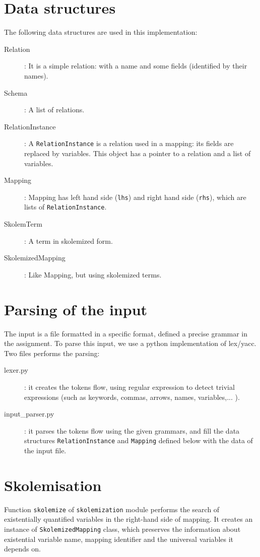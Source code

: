 \documentclass[a4paper,11pt]{article}
\begin{document}
\section{Data structures}
The following data structures are used in this implementation:
\begin{description}
  \item[Relation]: It is a simple relation: with a name and some fields (identified by their names).
  \item[Schema]: A list of relations.
  \item[RelationInstance]: A \texttt{RelationInstance} is a relation used in a mapping: its fields are replaced by variables. This object has a pointer to a relation and a list of variables.
  \item[Mapping]: Mapping has left hand side (\texttt{lhs}) and right hand side (\texttt{rhs}), which are lists of \texttt{RelationInstance}.
  \item[SkolemTerm]: A term in skolemized form.
  \item[SkolemizedMapping]: Like Mapping, but using skolemized terms.
\end{description}

\section{Parsing of the input}
The input is a file formatted in a specific format, defined a precise grammar in the assignment. To parse this input, we use a python implementation of lex/yacc. Two files performs the parsing:
\begin{description} 
  \item [lexer.py]: it creates the tokens flow, using regular expression to detect trivial expressions (such as keywords, commas, arrows, names, variables,... ). 
  \item [input\_parser.py]: it parses the tokens flow using the given grammars, and fill the data structures \texttt{RelationInstance} and \texttt{Mapping} defined below with the data of the input file. 
\end{description} 

\section{Skolemisation}
Function \texttt{skolemize} of \texttt{skolemization} module performs the search of existentially quantified variables in the right-hand side of mapping. It creates an instance of \texttt{SkolemizedMapping} class, which preserves the information about existential variable name, mapping identifier and the universal variables it depends on. 
\end{document}
